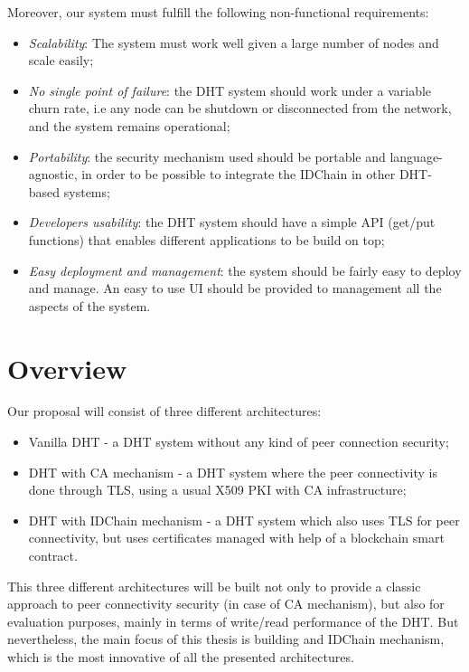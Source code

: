 Moreover, our system must fulfill the following non-functional requirements:

\begin{itemize}
  \item \textit{Scalability}: The system must work well given a large number of nodes and scale easily;
  \item \textit{No single point of failure}: the DHT system should work under a variable churn rate, i.e any node can be shutdown or disconnected from the network, and the system remains operational;
  \item \textit{Portability}: the security mechanism used should be portable and language-agnostic, in order to be possible to integrate the IDChain in other DHT-based systems;
  \item \textit{Developers usability}: the DHT system should have a simple API (get/put functions) that enables different applications to be build on top;
  \item \textit{Easy deployment and management}: the system should be fairly easy to deploy and manage. An easy to use \ac{UI} should be provided to management all the aspects of the system.
\end{itemize}

\section{Overview}\label{architecture:overview}

Our proposal will consist of three different architectures:

\begin{itemize}
  \item Vanilla \ac{DHT} - a \ac{DHT} system without any kind of peer connection security;
  \item DHT with \ac{CA} mechanism - a \ac{DHT} system where the peer connectivity is done through TLS, using a usual X509 \ac{PKI} with \ac{CA} infrastructure;
  \item DHT with IDChain mechanism - a \ac{DHT} system which also uses TLS for peer connectivity, but uses certificates managed with help of a blockchain smart contract.
\end{itemize}

This three different architectures will be built not only to provide a classic approach to peer connectivity security (in case of \ac{CA} mechanism), but also for evaluation purposes, mainly in terms of write/read performance of the \ac{DHT}.
But nevertheless, the main focus of this thesis is building and IDChain mechanism, which is the most innovative of all the presented architectures.

